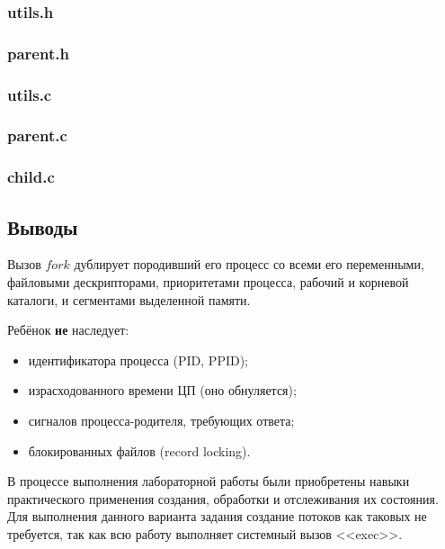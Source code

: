 \documentclass[12pt]{article}
\begin{document}
	\subsubsection*{utils.h}
	
	
	
	\subsubsection*{parent.h}
	
	
	
	\subsubsection{utils.c}
	
	
	
	\subsubsection{parent.c}
	
	
	
	\subsubsection{child.c}
	
	
	
	\subsection*{Выводы}
	
	Вызов $fork$ дублирует породивший его процесс со всеми его переменными, файловыми дескрипторами, приоритетами процесса, рабочий и корневой каталоги, и сегментами выделенной памяти.
	
	Ребёнок {\bf не} наследует:
	\begin{itemize}
		\item идентификатора процесса (PID, PPID);
		\item израсходованного времени ЦП (оно обнуляется);
		\item сигналов процесса-родителя, требующих ответа;
		\item блокированных файлов (record locking).
	\end{itemize}
	
	В процессе выполнения лабораторной работы были приобретены навыки практического применения создания, обработки и отслеживания их состояния. Для выполнения данного варианта задания создание потоков как таковых не требуется, так как всю работу выполняет системный вызов <<exec>>.
	
\end{document}
